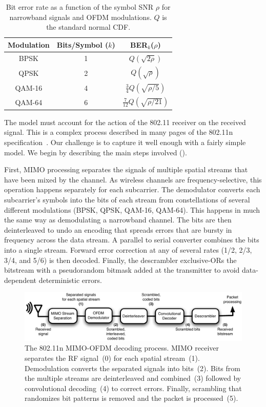 \begin{table}
\centering
\begin{tabular}{ccc}
\toprule
Modulation & Bits/Symbol ($k$) & BER$_k$($\rho$) \\
\midrule BPSK & 1 & $Q\left(\sqrt{2\rho}\right)$ \\
QPSK & 2 & $Q\left(\sqrt{\rho}\right)$\\
QAM-16 & 4 & $\frac{3}{4}Q\left(\sqrt{\rho/5}\right)$\\
QAM-64 & 6 & $\frac{7}{12}Q\left(\sqrt{\rho/21}\right)$\\
\bottomrule
\end{tabular}
\caption{\label{tab:ber_snr}Bit error rate as a function of the symbol SNR $\rho$ for narrowband signals and OFDM modulations. $Q$ is the standard normal CDF\@.}
\end{table}


The model must account for the action of the 802.11 receiver on the received signal. This is a complex process described in many pages of the 802.11n specification~\cite{80211n}. Our challenge is to capture it well enough with a fairly simple model. We begin by describing the main steps involved ().

First, MIMO processing separates the signals of multiple spatial streams that have been mixed by the channel. As wireless channels are frequency-selective, this operation happens separately for each subcarrier. The demodulator converts each subcarrier's symbols into the bits of each stream from constellations of several different modulations (BPSK, QPSK, QAM-16, QAM-64). This happens in much the same way as demodulating a narrowband channel. The bits are then deinterleaved to undo an encoding that spreads errors that are bursty in frequency across the data stream. A parallel to serial converter combines the bits into a single stream. Forward error correction at any of several rates (1/2, 2/3, 3/4, and 5/6) is then decoded. Finally, the descrambler exclusive-ORs the bitstream with a pseudorandom bitmask added at the transmitter to avoid data-dependent deterministic errors.

\begin{figure}[ht!]
\centering
\includegraphics[width=6in]{figures/esnr/mimo_ofdm_decoding_process.pdf}
\caption[The 802.11n MIMO-OFDM decoding process.]{\label{fig:ofdm_decoding} The 802.11n MIMO-OFDM decoding process. MIMO receiver separates the RF signal~(0) for each spatial stream~(1). Demodulation converts the separated signals into bits~(2). Bits from the multiple streams are deinterleaved and combined~(3) followed by convolutional decoding~(4) to correct errors. Finally, scrambling that randomizes bit patterns is removed and the packet is processed~(5).}
\end{figure}


